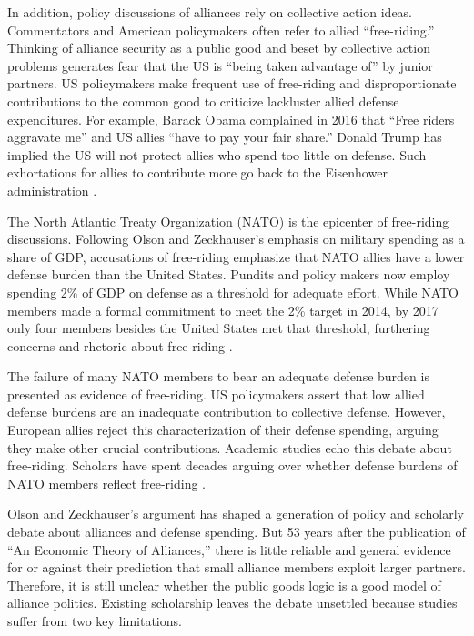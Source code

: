 \documentclass[12pt]{article}
\begin{document}
In addition, policy discussions of alliances rely on collective action ideas.
Commentators and American policymakers often refer to allied ``free-riding.'' 
Thinking of alliance security as a public good and beset by collective action problems generates fear that the US is ``being taken advantage of'' by junior partners. 
US policymakers make frequent use of free-riding and disproportionate contributions to the common good to criticize lackluster allied defense expenditures.  
For example, Barack Obama complained in 2016 that ``Free riders aggravate me'' and US allies ``have to pay your fair share.'' 
Donald Trump has implied the US will not protect allies who spend too little on defense. 
Such exhortations for allies to contribute more go back to the Eisenhower administration \citep{Lanoszka2015}.


The North Atlantic Treaty Organization (NATO) is the epicenter of free-riding discussions. 
Following Olson and Zeckhauser's emphasis on military spending as a share of GDP, accusations of free-riding emphasize that NATO allies have a lower defense burden than the United States. 
Pundits and policy makers now employ spending 2\% of GDP on defense as a threshold for adequate effort.
While NATO members made a formal commitment to meet the 2\% target in 2014, by 2017 only four members besides the United States met that threshold, furthering concerns and rhetoric about free-riding \citep{EconomistNATO2017}. 


The failure of many NATO members to bear an adequate defense burden is presented as evidence of free-riding. 
US policymakers assert that low allied defense burdens are an inadequate contribution to collective defense. 
However, European allies reject this characterization of their defense spending, arguing they make other crucial contributions. 
Academic studies echo this debate about free-riding.  
Scholars have spent decades arguing over whether defense burdens of NATO members reflect free-riding \citep{SandlerForbes1980, Palmer1990, GatesTerasawa1992, SandlerHartley2001, Lanoszka2015, PluemperNeumayer2015}.


Olson and Zeckhauser's argument has shaped a generation of policy and scholarly debate about alliances and defense spending. 
But 53 years after the publication of ``An Economic Theory of Alliances,'' there is little reliable and general evidence for or against their prediction that small alliance members exploit larger partners. 
Therefore, it is still unclear whether the public goods logic is a good model of alliance politics. 
Existing scholarship leaves the debate unsettled because studies suffer from two key limitations.
\end{document}
